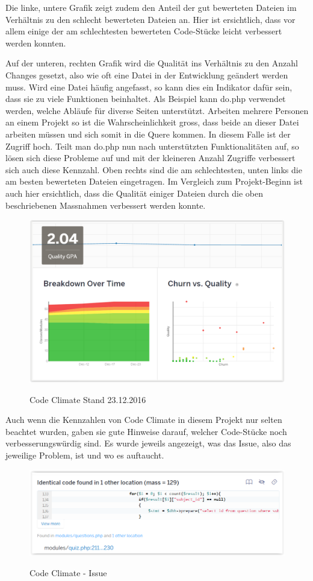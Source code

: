 Die linke, untere Grafik zeigt zudem den Anteil der gut bewerteten Dateien im Verhältnis zu den schlecht bewerteten Dateien an. Hier ist ersichtlich, dass vor allem einige der am schlechtesten bewerteten Code-Stücke leicht verbessert werden konnten.

Auf der unteren, rechten Grafik wird die Qualität ins Verhältnis zu den Anzahl Changes gesetzt, also wie oft eine Datei in der Entwicklung geändert werden muss. Wird eine Datei häufig angefasst, so kann dies ein Indikator dafür sein, dass sie zu viele Funktionen beinhaltet. Als Beispiel kann do.php verwendet werden, welche Abläufe für diverse Seiten unterstützt. Arbeiten mehrere Personen an einem Projekt so ist die Wahrscheinlichkeit gross, dass beide an dieser Datei arbeiten müssen und sich somit in die Quere kommen. In diesem Falle ist der Zugriff hoch. Teilt man do.php nun nach unterstützten Funktionalitäten auf, so lösen sich diese Probleme auf und mit der kleineren Anzahl Zugriffe verbessert sich auch diese Kennzahl. Oben rechts sind die am schlechtesten, unten links die am besten bewerteten Dateien eingetragen. Im Vergleich zum Projekt-Beginn ist auch hier ersichtlich, dass die Qualität einiger Dateien durch die oben beschriebenen Massnahmen verbessert werden konnte.

\begin{figure}[H]
	\centering
	\includegraphics[width=.7\textwidth]{Images/CodeClimate_Ende.PNG}
	\caption{Code Climate Stand 23.12.2016}
	\cite{codeclimate.com}
\end{figure}

Auch wenn die Kennzahlen von Code Climate in diesem Projekt nur selten beachtet wurden, gaben sie gute Hinweise darauf, welcher Code-Stücke noch verbesserungswürdig sind. Es wurde jeweils angezeigt, was das Issue, also das jeweilige Problem, ist und wo es auftaucht.

\begin{figure}[H]
	\centering
	\includegraphics[width=.7\textwidth]{Images/CodeClimate_Issue.PNG}
	\caption{Code Climate - Issue}
	\cite{codeclimate.com}
\end{figure}



